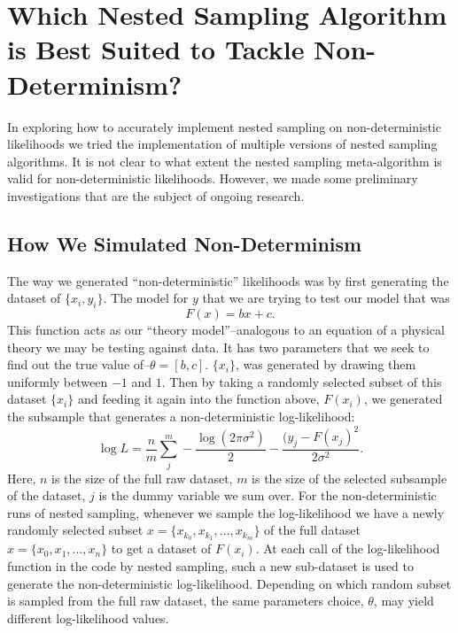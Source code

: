 \section{Which Nested Sampling Algorithm is Best Suited to Tackle Non-Determinism?}\label{sec:nondet}

In exploring how to accurately implement nested sampling on non-deterministic likelihoods we tried the implementation of multiple versions of nested sampling algorithms. It is not clear to what extent the nested sampling meta-algorithm is valid for non-deterministic likelihoods. However, we made some preliminary investigations that are the subject of ongoing research.


\subsection{How We Simulated Non-Determinism}
The way we generated ``non-deterministic'' likelihoods was by first generating the dataset of $\{x_i,y_i\}$. The model for $y$ that we are trying to test our model that was
\begin{equation}
F(x)= bx+c.
\end{equation}
This function acts as our ``theory model''--analogous to an equation of a physical theory we may be testing against data. It has two parameters that we seek to find out the true value of--$\theta = [b,c]$. $\{x_i\}$, was generated by drawing them uniformly between $-1$ and $1$. Then by taking a randomly selected subset of this dataset $\{x_i\}$ and feeding it again into the function above, $F(x_i)$, we generated the subsample that generates a non-deterministic log-likelihood:
%
\begin{equation}
    \log L = \frac{n}{m}\sum_j^m -\frac{\log (2\pi\sigma^2)}{2} - \frac{ (y_j - F(x_j)^2}{2\sigma^2}.
\end{equation}
%
Here, $n$ is the size of the full raw dataset, $m$ is the size of the selected subsample of the dataset, $j$ is the dummy variable we sum over. For the non-deterministic runs of nested sampling, whenever we sample the log-likelihood we have a newly randomly selected subset $x = \{ x_{k_0}, x_{k_1},...,x_{k_m}\}$ of the full dataset $x= \{ x_0,x_1,...,x_n \}$ to get a dataset of $F(x_i)$. At each call of the log-likelihood function in the code by nested sampling, such a new sub-dataset is used to generate the non-deterministic log-likelihood. Depending on which random subset is sampled from the full raw dataset, the same parameters choice, $\theta$, may yield different log-likelihood values.




